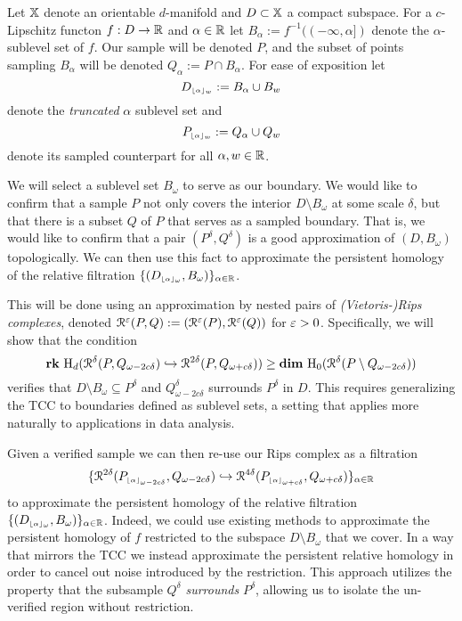 
Let $\mathbb{X}$ denote an orientable $d$-manifold and $D\subset\mathbb{X}$ a compact subspace.
For a $c$-Lipschitz functon $f : D\to \mathbb{R}$ and $\alpha\in\mathbb{R}$ let $B_\alpha := f^{-1}((-\infty,\alpha])$ denote the $\alpha$-sublevel set of $f$.
Our sample will be denoted $P$, and the subset of points sampling $B_\alpha$ will be denoted $Q_\alpha := P\cap B_\alpha$.
For ease of exposition let
\[ D_{\scriptscriptstyle \lfloor\alpha\rfloor_{w}} := B_\alpha\cup B_w \]
denote the \emph{truncated} $\alpha$ sublevel set and  %
\[ P_{\scriptscriptstyle \lfloor\alpha\rfloor_{w}} := Q_\alpha\cup Q_w\]
denote its sampled counterpart for all $\alpha,w\in\mathbb{R}$.

We will select a sublevel set $B_\omega$ to serve as our boundary.
We would like to confirm that a sample $P$ not only covers the interior $D\setminus B_\omega$ at some scale $\delta$, but that there is a subset $Q$ of $P$ that serves as a sampled boundary.
That is, we would like to confirm that a pair $(P^\delta, Q^\delta)$ is a good approximation of $(D, B_\omega)$ topologically.
We can then use this fact to approximate the persistent homology of the relative filtration $\{(D_{\scriptscriptstyle \lfloor\alpha\rfloor_{\omega}}, B_\omega)\}_{\alpha\in\mathbb{R}}$.

This will be done using an approximation by nested pairs of \emph{(Vietoris-)Rips complexes}, denoted $\mathcal{R}^\varepsilon(P, Q) := (\mathcal{R}^\varepsilon(P), \mathcal{R}^\varepsilon(Q))$ for $\varepsilon > 0$.
Specifically, we will show that the condition
\[ \mathbf{rk}~\mathrm{H}_d(\mathcal{R}^\delta(P, Q_{\omega - 2c\delta})\hookrightarrow \mathcal{R}^{2\delta}(P, Q_{\omega+c\delta}))\geq \mathbf{dim}~\mathrm{H}_0(\mathcal{R}^\delta(P\setminus Q_{\omega-2c\delta}))\]
verifies that $D\setminus B_\omega\subseteq P^\delta$ and $Q_{\omega-2c\delta}^\delta$ surrounds $P^\delta$ in $D$.
This requires generalizing the TCC to boundaries defined as sublevel sets, a setting that applies more naturally to applications in data analysis.

Given a verified sample we can then re-use our Rips complex as a filtration
\[ \{\mathcal{R}^{2\delta}(P_{\scriptscriptstyle \lfloor\alpha\rfloor_{\omega-2c\delta}}, Q_{\omega-2c\delta})\hookrightarrow \mathcal{R}^{4\delta}(P_{\scriptscriptstyle \lfloor\alpha\rfloor_{\omega+c\delta}}, Q_{\omega+c\delta})\}_{\alpha\in\mathbb{R}}\]
to approximate the persistent homology of the relative filtration $\{(D_{\scriptscriptstyle \lfloor\alpha\rfloor_{\omega}}, B_\omega)\}_{\alpha\in\mathbb{R}}$.
Indeed, we could use existing methods to approximate the persistent homology of $f$ restricted to the subspace $D\setminus B_\omega$ that we cover.
In a way that mirrors the TCC we instead approximate the persistent relative homology in order to cancel out noise introduced by the restriction.
This approach utilizes the property that the subsample $Q^\delta$ \emph{surrounds} $P^\delta$, allowing us to isolate the un-verified region without restriction.

